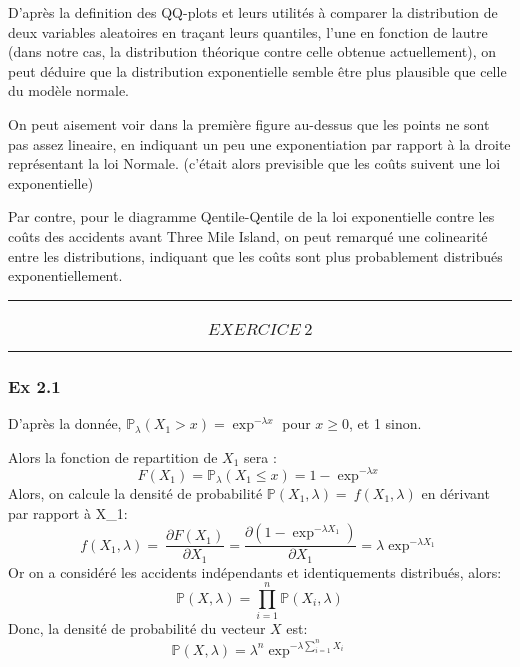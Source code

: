 \documentclass[11pt]{article}
\begin{document}
    D'après la definition des QQ-plots et leurs utilités à comparer la
distribution de deux variables aleatoires en traçant leurs quantiles,
l'une en fonction de lautre (dans notre cas, la distribution théorique
contre celle obtenue actuellement), on peut déduire que la distribution
exponentielle semble être plus plausible que celle du modèle normale.

On peut aisement voir dans la première figure au-dessus que les points
ne sont pas assez lineaire, en indiquant un peu une exponentiation par
rapport à la droite représentant la loi Normale. (c'était alors
previsible que les coûts suivent une loi exponentielle)

Par contre, pour le diagramme Qentile-Qentile de la loi exponentielle
contre les coûts des accidents avant Three Mile Island, on peut remarqué
une colinearité entre les distributions, indiquant que les coûts sont
plus probablement distribués exponentiellement.

    \begin{center}\rule{0.5\linewidth}{\linethickness}\end{center}

\subsubsection{\texorpdfstring{\[EXERCICE\ 2\]}{EXERCICE\textbackslash{} 2}}\label{exercice-2}

    \begin{center}\rule{0.5\linewidth}{\linethickness}\end{center}

\subsubsection{Ex 2.1}\label{ex-2.1}

    D'après la donnée, \(\mathbb{P}_\lambda(X_1>x) = \exp^{-\lambda x}\)
pour \(x\geq0\), et 1 sinon.

Alors la fonction de repartition de \(X_1\) sera :
\[F(X_1) = \mathbb{P}_\lambda(X_1\leq x) = 1 - \exp^{-\lambda x}\]
Alors, on calcule la densité de probabilité
\(\mathbb{P}(X_1,\lambda)=\ f(X_1,\lambda)\) en dérivant par rapport à
X\_1:
\[  f(X_1,\lambda) =\ \frac{\partial F(X_1)}{\partial X_1} = \frac{\partial (1 - \exp^{-\lambda X_1})}{\partial X_1}=\lambda \exp^{-\lambda X_1}\]
Or on a considéré les accidents indépendants et identiquements
distribués, alors:
\[\mathbb{P}(X,\lambda) = \prod_{i=1}^n\mathbb{P}(X_i,\lambda)\] Donc,
la densité de probabilité du vecteur \(X\) est:
\[\mathbb{P}(X,\lambda) = \lambda^n \exp^{-\lambda \sum_{i=1}^nX_i}\]
\end{document}
